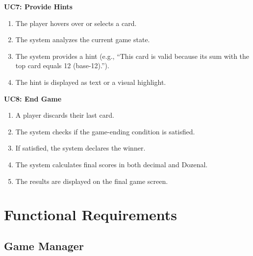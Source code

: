 \documentclass[12pt]{article}
\begin{document}
\noindent\textbf{UC7: Provide Hints}
\begin{enumerate}
    \item The player hovers over or selects a card.
    \item The system analyzes the current game state.
    \item The system provides a hint (e.g., ``This card is valid because its sum with the top card equals 12 (base-12).'').
    \item The hint is displayed as text or a visual highlight.
\end{enumerate}

\noindent\textbf{UC8: End Game}
\begin{enumerate}
    \item A player discards their last card.
    \item The system checks if the game-ending condition is satisfied.
    \item If satisfied, the system declares the winner.
    \item The system calculates final scores in both decimal and Dozenal.
    \item The results are displayed on the final game screen.
\end{enumerate}



\section{Functional Requirements}

\subsection{Game Manager}
\end{document}
